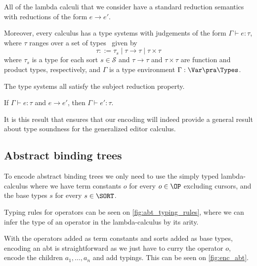 \documentclass[sigplan,review]{acmart}
\newcommand{\abt}{\textsf{abt}\xspace}
\begin{document}
 All of the lambda calculi that we consider have a
 standard reduction semantics with reductions of the form $e \to
 e'$.

 Moreover, every calculus has a type systems with judgements of the
 form $\Gamma \vdash e : \tau$, where $\tau$ ranges over a set of
 types \Types\ given by
%
\[  \tau ::= \tau_s \mid \tau \to \tau \mid \tau \times \tau  \]
%
where $\tau_s$ is a type for each sort $s \in \mathcal{S}$ and $\tau
\to \tau$ and $\tau \times \tau$ are function and product types,
respectively, and $\Gamma$ is a type environment
 $\Gamma : \Var \pra \Types$.

 The type systems all satisfy the subject
 reduction property.

 \begin{theorem}\label{thm:subred}
   If $\Gamma \vdash e : \tau$ and $e \to e'$, then $\Gamma \vdash e'
   : \tau$.
 \end{theorem}

 It is this result that ensures that our encoding will indeed provide
 a general result about type soundness for the generalized editor
 calculus.

\subsection{Abstract binding trees}

To encode abstract binding trees we only need to use the simply typed
lambda-calculus where we have term constants $o$ for every $o \in \OP$
excluding cursors, and the base types $s$ for every $s \in \SORT$.

Typing rules for operators can be seen on \cref{fig:abt_typing_rules},
where we can infer the type of an operator in the lambda-calculus by
its arity.

With the operators added as term constants and sorts added as base
types, encoding an {\abt} is straightforward as we just have to curry the
operator $o$, encode the children $a_1, \dots, a_n$ and add
typings. This can be seen on \cref{fig:enc_abt}.

\end{document}
